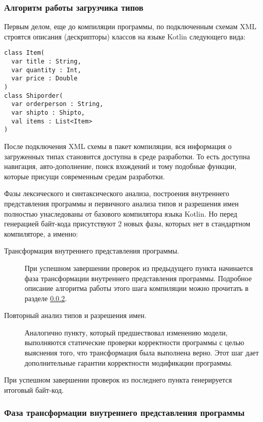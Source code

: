 \subsubsection{Алгоритм работы загрузчика типов}

Первым делом, еще до компиляции программы, по подключенным схемам XML строятся описания (дескрипторы) классов на языке Kotlin следующего вида:

\begin{code}\begin{lstlisting}[caption={Примеры описаний классов для загруженных типов.}, label=xsd-type-descriptors]
class Item(
  var title : String,
  var quantity : Int,
  var price : Double
)
class Shiporder(
  var orderperson : String,
  var shipto : Shipto,
  val items : List<Item>
)
\end{lstlisting}\end{code}

После подключения XML схемы в пакет компиляции, вся информация о загруженных типах становится доступна в среде разработки. То есть доступна навигация, авто-дополнение, поиск вхождений и тому подобные функции, которые присущи современным средам разработки.

Фазы лексического и синтаксического анализа, построения внутреннего представления программы и первичного анализа типов и разрешения имен полностью унаследованы от базового компилятора языка Kotlin. Но перед генерацией байт-кода присутствуют 2 новых фазы, которых нет в стандартном компиляторе, а именно:

\begin{description}
\item[Трансформация внутреннего представления программы.] При успешном завершении проверок из предыдущего пункта начинается фаза трансформации внутреннего представления программы. Подробное описание алгоритма работы этого шага компиляции можно прочитать в разделе \ref{xml-tranformation-phase}.
\item[Повторный анализ типов и разрешения имен.]
Аналогично пункту, который предшествовал изменению модели, выполняются статические проверки корректности программы с целью выяснения того, что трансформация была выполнена верно. Этот шаг дает дополнительные гарантии корректности модификации программы.
\end{description}

При успешном завершении проверок из последнего пункта генерируется итоговый байт-код.

\subsubsection{Фаза трансформации внутреннего представления программы}\label{xml-tranformation-phase}

